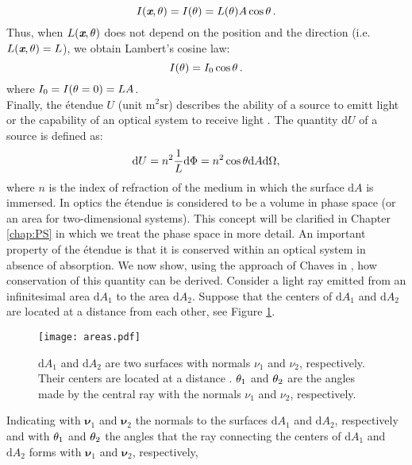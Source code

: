 \begin{equation}
I(\textit{\textbf{x}}, \theta) = I(\theta) = L(\theta) A \cos\theta\,.
\end{equation}
Thus, when $L(\textit{\textbf{x}},\theta)$ does not depend on the position and the direction (i.e. $L(\textit{\textbf{x}},\theta)=L$), we obtain Lambert's cosine law:
\begin{equation}
I(\theta) = I_0\cos\theta\,.
\end{equation}
where $I_0 = I(\theta = 0) = LA$. \\
\indent Finally, the \'{e}tendue $U$ (unit $\textrm{m}^2\textrm{sr}$) describes the ability of a source to emitt light or the capability of an optical system to receive light \cite{zhu2011etendue}.
The quantity $ \textrm{d}U $ of a source is defined as:
\begin{equation}\label{etendue}
\textrm{d}U = n^2  \frac{1}{L}\textrm{d}\Phi = n^2 \cos\theta\textrm{d}A\textrm{d}\Omega,
\end{equation}
where $n$ is the index of refraction of the medium in which the surface $\textrm{d}A$ is immersed. In optics the \'{e}tendue is considered to be a volume in phase space  (or an area for two-dimensional systems). This concept will be clarified in Chapter \ref{chap:PS} in which we treat the phase space in more detail.
An important property of the \'{e}tendue is that it is conserved within an optical system in absence of absorption. We now show, using the approach of Chaves in \cite{chaves2015introduction}, 
how conservation of this quantity can be derived.
Consider a light ray emitted from an infinitesimal area $\textrm{d}A_1$ to the area $\textrm{d}A_2$. Suppose that the centers of $\textrm{d}A_1$ and $\textrm{d}A_2$ 
are located at a distance  from each other,  see Figure \ref{fig:etendue_conservation}.
\begin{figure}[h]
 \label{fig:etendue_conservation}
     \begin{center}
     \texttt{[image: areas.pdf]}
     \end{center}
     \caption{$\textrm{d}A_1$ and $\textrm{d}A_2$ are two surfaces with normals $\nu_1$ and $\nu_2$, respectively. Their centers are located at a distance .
$\theta_1$ and $\theta_2$ are the angles made by the central ray with the normals $\nu_1$ and $\nu_2$, respectively.}
\label{fig:etendue_conservation}
 \end{figure}
Indicating with $\boldsymbol{\nu}_1$ and $\boldsymbol{\nu}_2$ the normals to the surfaces $\textrm{d}A_1$ and $\textrm{d}A_2$, respectively and with $\theta_1$ and $\theta_2$ the angles that the ray connecting the centers of $\textrm{d}A_1$ and $\textrm{d}A_2$ forms with $\boldsymbol{\nu}_1$ and $\boldsymbol{\nu}_2$, respectively,
